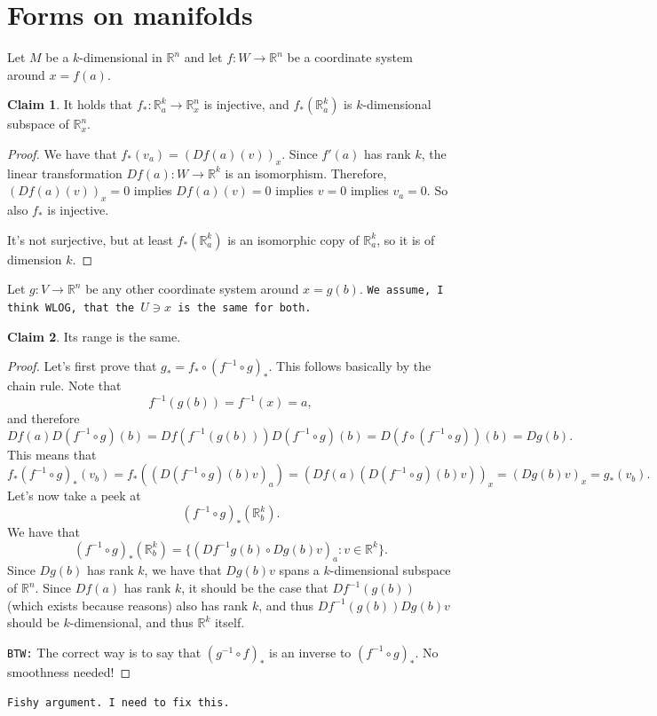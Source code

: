 \documentclass{article}
\theoremstyle{definition}
\newtheorem{claim}{Claim}
\begin{document}
\section{Forms on manifolds}
Let $M$ be a $k$-dimensional in $\mathbb{R}^n$ and let $f:W\to\mathbb{R}^n$ be a coordinate system around $x=f(a)$.
\begin{claim}
  It holds that $f_\ast:\mathbb{R}^k_a\to\mathbb{R}^n_x$ is injective, and $f_\ast(\mathbb{R}^k_a)$ is $k$-dimensional subspace of $\mathbb{R}^n_x$.
\end{claim}
\begin{proof}
  We have that $f_\ast(v_a)=(Df(a)(v))_x$. Since $f'(a)$ has rank $k$, the linear transformation $Df(a):W\to\mathbb{R}^k$ is an isomorphism. Therefore, $(Df(a)(v))_x=0$ implies $Df(a)(v)=0$ implies $v=0$ implies $v_a=0$. So also $f_\ast$ is injective.

  It's not surjective, but at least $f_\ast(\mathbb{R}^k_a)$ is an isomorphic copy of $\mathbb{R}^k_a$, so it is of dimension $k$.
\end{proof}
Let $g:V\to\mathbb{R}^n$ be any other coordinate system around $x=g(b)$. {\tt We assume, I think WLOG, that the $U\ni x$ is the same for both.}
\begin{claim}
  Its range is the same.
\end{claim}
\begin{proof}
  \cbstart
  Let's first prove that $g_\ast=f_\ast\circ(f^{-1}\circ g)_\ast$. This follows basically by the chain rule. Note that
  \[f^{-1}(g(b))=f^{-1}(x)=a,\]
  and therefore
  \[Df(a)D(f^{-1}\circ g)(b)=Df(f^{-1}(g(b)))D(f^{-1}\circ g)(b)=D(f\circ(f^{-1}\circ g))(b)=Dg(b).\]
  This means that
  \[f_\ast(f^{-1}\circ g)_\ast(v_b)=f_\ast((D(f^{-1}\circ g)(b)v)_a)=(Df(a)(D(f^{-1}\circ g)(b)v))_x=(Dg(b)v)_x=g_\ast(v_b).\]
  Let's now take a peek at
  \[(f^{-1}\circ g)_\ast(\mathbb{R}^k_b).\]
  We have that
  \[(f^{-1}\circ g)_\ast(\mathbb{R}^k_b)=\{(Df^{-1}g(b)\circ Dg(b)v)_a:v\in\mathbb{R}^k\}.\]
  Since $Dg(b)$ has rank $k$, we have that $Dg(b)v$ spans a $k$-dimensional subspace of $\mathbb{R}^n$. Since $Df(a)$ has rank $k$, it should be the case that $Df^{-1}(g(b))$ (which exists because reasons) also has rank $k$, and thus $Df^{-1}(g(b))Dg(b)v$ should be $k$-dimensional, and thus $\mathbb{R}^k$ itself.
  \cbend

  {\tt BTW:} The correct way is to say that $(g^{-1}\circ f)_\ast$ is an inverse to $(f^{-1}\circ g)_\ast$. No smoothness needed!
\end{proof}
{\tt Fishy argument. I need to fix this.}
\end{document}
